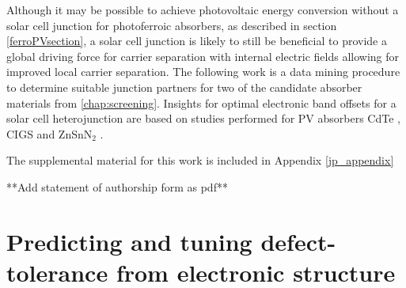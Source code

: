\documentclass[11pt, twoside]{report}
\begin{document}
Although it may be possible to achieve photovoltaic energy conversion without a solar cell junction for photoferroic absorbers, as described in section \ref{ferroPVsection}, a solar cell junction is likely to still be beneficial to provide a global driving force for carrier separation with internal electric fields allowing for improved local carrier separation. The following work is a data mining procedure to determine suitable junction partners for two of the candidate absorber materials from \autoref{chap:screening}. Insights for optimal electronic band offsets for a solar cell heterojunction are based on studies performed for PV absorbers CdTe \cite{CdTe_spike}, CIGS \cite{p-type_spike} and ZnSnN$_2$ \cite{Elisabetta}.

The supplemental material for this work is included in Appendix \ref{jp_appendix}

**Add statement of authorship form as pdf**






\section{Predicting and tuning defect-tolerance from electronic structure}\label{sulfosalt_defects}
\end{document}
